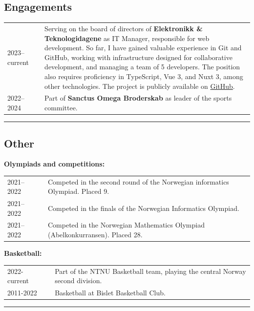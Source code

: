 \documentclass[10pt]{article}
\newlength{\cw}
\newlength{\cwl}
\begin{document}
\subsection*{Engagements}
\begin{tabular}{p{\cw} @{:}l p{\cwl}}
  2023--current & & Serving on the board of directors of \textbf{Elektronikk \& Teknologidagene} as IT Manager, responsible for web development.
  So far, I have gained valuable experience in Git and GitHub, working with infrastructure designed for collaborative development, and managing a team of 5 developers.
  The position also requires proficiency in TypeScript, Vue 3, and Nuxt 3, among other technologies.
  The project is publicly available on \href{https://github.com/et-dagen}{GitHub}.
  \\
  2022--2024 & & Part of \textbf{Sanctus Omega Broderskab} as leader of the sports committee.\\
\end{tabular}
\vspace{0.1cm}
\hrule
\vspace{0.1cm}

\subsection*{Other}
\textbf{Olympiads and competitions:}

\begin{tabular}{p{\cw} @{:}l p{\cwl}}
  2021--2022 & & Competed in the second round of the Norwegian informatics Olympiad. Placed 9.\\
  2021--2022 & & Competed in the finals of the Norwegian Informatics Olympiad.\\
  2021--2022 & & Competed in the Norwegian Mathematics Olympiad (Abelkonkurransen). Placed 28.\\
\end{tabular}

\textbf{Basketball:}

\begin{tabular}{p{\cw} @{:}l p{\cwl}}
  2022-current & & Part of the NTNU Basketball team, playing the central Norway second division.\\
  2011-2022 & & Basketball at Bislet Basketball Club.\\
\end{tabular}
\vspace{0.1cm}
\hrule
\vspace{0.1cm}

\end{document}
